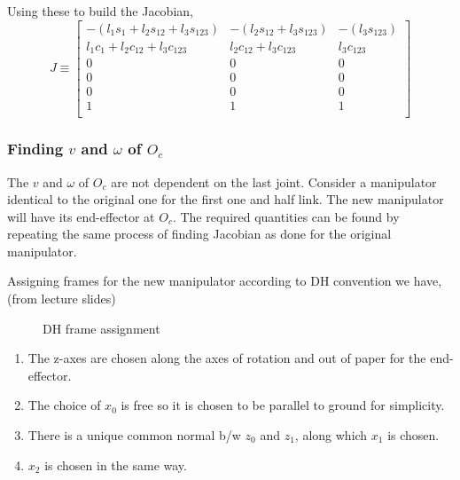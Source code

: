 \documentclass[12pt]{article}
\newcommand{\fromlectures}{{\\ \color{blue} \hspace*{\fill}(from lecture slides)} \\}
\begin{document}
Using these to build the Jacobian,
\[
  J \equiv
  \begin{bmatrix}
    -(l_1s_1 + l_2s_{12} + l_3s_{123}) & -(l_2s_{12} + l_3s_{123}) & -(l_3s_{123})\\
    l_1c_1 + l_2c_{12} + l_3c_{123} & l_2c_{12} + l_3c_{123} & l_3c_{123}\\
    0 & 0 & 0 \\
    0 & 0 & 0 \\
    0 & 0 & 0 \\
    1 & 1 & 1 \\
  \end{bmatrix}
\]

\subsubsection*{Finding $v$ and $\omega$ of $O_c$}
The $v$ and $\omega$ of $O_c$ are not dependent on the last joint.
Consider a manipulator identical to the original one for the first one and half link.
The new manipulator will have its end-effector at $O_c$.
The required quantities can be found by repeating the same process of finding Jacobian as done for the original manipulator.

Assigning frames for the new manipulator according to DH convention we have,
\fromlectures
\begin{figure}[h]
  \centering
  \caption{DH frame assignment}
  \label{fig:q1.3}
\end{figure}

\begin{enumerate}[nolistsep]
  \item The z-axes are chosen along the axes of rotation and out of paper for the end-effector.
  \item The choice of $x_0$ is free so it is chosen to be parallel to ground for simplicity.
  \item There is a unique common normal b/w $z_0$ and $z_1$, along which $x_1$ is chosen.
  \item $x_2$ is chosen in the same way.
\end{enumerate}
\end{document}

